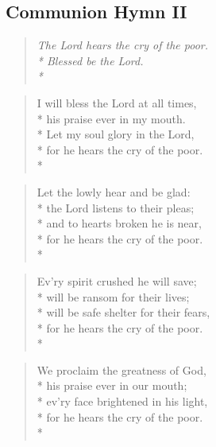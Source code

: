\documentclass[12pt]{article}
\newcounter{count}
\newcommand\printcount{\addtocounter{count}{1}\thecount}
\begin{document}
\begin{center}
\subsection*{Communion Hymn II}
\end{center}
\begin{multicols}{2}
\setcounter{count}{0}
\setcounter{count}{0}
\begin{verse}
\textit{The Lord hears the cry of the poor.\\*
Blessed be the Lord.\\*}
\end{verse}

\begin{verse}
\flagverse{\printcount.} I will bless the Lord at all times,\\*
his praise ever in my mouth.\\*
Let my soul glory in the Lord,\\*
for he hears the cry of the poor.\\*
\end{verse}

\begin{verse}
\flagverse{\printcount.} Let the lowly hear and be glad:\\*
the Lord listens to their pleas;\\*
and to hearts broken he is near,\\*
for he hears the cry of the poor.\\*
\end{verse}

\begin{verse}
\flagverse{\printcount.} Ev'ry spirit crushed he will save;\\*
will be ransom for their lives;\\*
will be safe shelter for their fears,\\*
for he hears the cry of the poor.\\*
\end{verse}

\begin{verse}
\flagverse{\printcount.} We proclaim the greatness of God,\\*
his praise ever in our mouth;\\*
ev'ry face brightened in his light,\\*
for he hears the cry of the poor.\\*
\end{verse}
\end{multicols}
\end{document}
